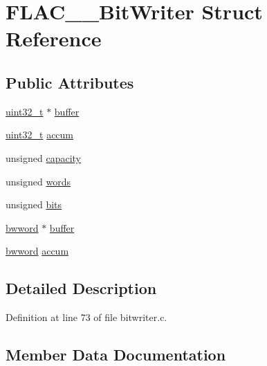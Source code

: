 \hypertarget{struct_f_l_a_c_____bit_writer}{}\section{F\+L\+A\+C\+\_\+\+\_\+\+Bit\+Writer Struct Reference}
\label{struct_f_l_a_c_____bit_writer}
\subsection*{Public Attributes}
\begin{DoxyCompactItemize}
\item 
\hyperlink{lib-src_2ffmpeg_2win32_2stdint_8h_a6eb1e68cc391dd753bc8ce896dbb8315}{uint32\+\_\+t} $\ast$ \hyperlink{struct_f_l_a_c_____bit_writer_a67f6b62b61e9b81735a22deefca7b620}{buffer}
\item 
\hyperlink{lib-src_2ffmpeg_2win32_2stdint_8h_a6eb1e68cc391dd753bc8ce896dbb8315}{uint32\+\_\+t} \hyperlink{struct_f_l_a_c_____bit_writer_abbfbd68ac3abfc1351a75c0af1b20feb}{accum}
\item 
unsigned \hyperlink{struct_f_l_a_c_____bit_writer_aece58c99ff9ff4a2680deee41a422448}{capacity}
\item 
unsigned \hyperlink{struct_f_l_a_c_____bit_writer_a03780c7567c8b0da65ad1651e81b85b1}{words}
\item 
unsigned \hyperlink{struct_f_l_a_c_____bit_writer_ae397bee0458fc8bdd02ba5ecefddfbb8}{bits}
\item 
\hyperlink{test__lib_f_l_a_c_2bitwriter_8c_a5a6cabc1c4a899043ba467278384b1b9}{bwword} $\ast$ \hyperlink{struct_f_l_a_c_____bit_writer_acb67e48bb8ba97835d71ed972c287a96}{buffer}
\item 
\hyperlink{test__lib_f_l_a_c_2bitwriter_8c_a5a6cabc1c4a899043ba467278384b1b9}{bwword} \hyperlink{struct_f_l_a_c_____bit_writer_aa9fe71d7ae8e9702242bc4c4660aa649}{accum}
\end{DoxyCompactItemize}


\subsection{Detailed Description}


Definition at line 73 of file bitwriter.\+c.



\subsection{Member Data Documentation}
